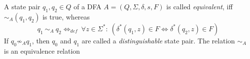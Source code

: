 \begin{definition}\cite[p. 154]{hopcroft01}
	A state pair $q_1, q_2 \in Q$ of a DFA $A = (Q, \Sigma, \delta, s, F)$ is called \emph{equivalent}, iff $\sim_A(q_1, q_2)$ is true, whereas
	\begin{displaymath}
	q_1\ \sim_A\ q_2 \Leftrightarrow_{def}\ \forall z \in \Sigma^* \colon\ (\delta^*(q_1, z) \in F \Leftrightarrow \delta^*(q_2, z) \in F)
	\end{displaymath}
	If $q_0 \not\sim_A q_1$, then $q_0$ and $q_1$ are called a \emph{distinguishable} state pair. The relation $\sim_A$ is an equivalence relation
\end{definition}

